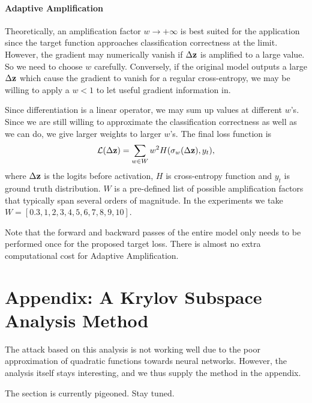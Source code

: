 \documentclass{article}
\begin{document}
\paragraph{Adaptive Amplification} Theoretically, an amplification factor $w \to +\infty$ is best suited for the application since the target function approaches classification correctness at the limit. However, the gradient may numerically vanish if $\Delta \mathbf{z}$ is amplified to a large value. So we need to choose $w$ carefully. Conversely, if the original model outputs a large $\Delta \mathbf{z}$ which cause the gradient to vanish for a regular cross-entropy, we may be willing to apply a $w < 1$ to let useful gradient information in.

Since differentiation is a linear operator, we may sum up values at different $w$'s. Since we are still willing to approximate the classification correctness as well as we can do, we give larger weights to larger $w$'s. The final loss function is
\begin{equation}
    \mathcal{L}(\Delta \mathbf{z}) = \sum_{w \in W} w^2 H(\sigma_w(\Delta \mathbf{z}), y_t),
\end{equation}
where $\Delta \mathbf{z}$ is the logits before activation, $H$ is cross-entropy function and $y_t$ is ground truth distribution. $W$ is a pre-defined list of possible amplification factors that typically span several orders of magnitude. In the experiments we take $W = [0.3, 1, 2, 3, 4, 5, 6, 7, 8, 9, 10]$.

Note that the forward and backward passes of the entire model only needs to be performed once for the proposed target loss. There is almost no extra computational cost for Adaptive Amplification.

\section*{Appendix: A Krylov Subspace Analysis Method}

The attack based on this analysis is not working well due to the poor approximation of quadratic functions towards neural networks. However, the analysis itself stays interesting, and we thus supply the method in the appendix.

The section is currently pigeoned. Stay tuned.

\newpage
{\small


}
\end{document}
